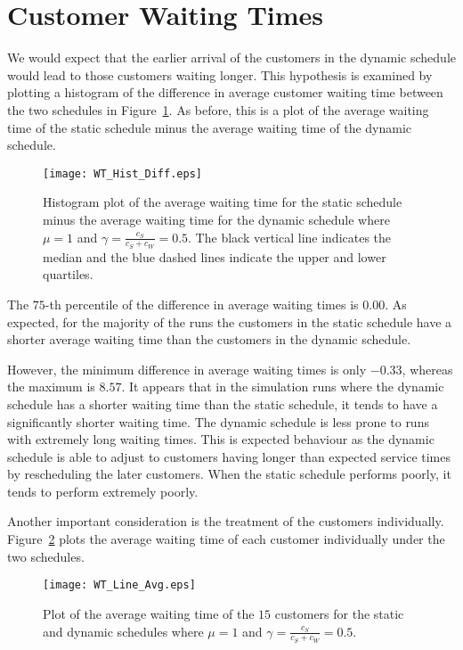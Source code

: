 \section{Customer Waiting Times}
We would expect that the earlier arrival of the customers in the dynamic schedule would lead to those customers waiting longer. This hypothesis is examined by plotting a histogram of the difference in average customer waiting time between the two schedules in Figure~\ref{fig:Diff_Wait}. As before, this is a plot of the average waiting time of the static schedule minus the average waiting time of the dynamic schedule.
\begin{figure}[htb]
	\centering
	\texttt{[image: WT\_Hist\_Diff.eps]}
	\caption{Histogram plot of the average waiting time for the static schedule minus the average waiting time for the dynamic schedule where $\mu = 1$ and $\gamma = \frac{c_{S}}{c_{S} + c_{W}} = 0.5$. The black vertical line indicates the median and the blue dashed lines indicate the upper and lower quartiles.}
	\label{fig:Diff_Wait}
\end{figure}

The $75$-th percentile of the difference in average waiting times is $0.00$. As expected, for the majority of the runs the customers in the static schedule have a shorter average waiting time than the customers in the dynamic schedule.

However, the minimum difference in average waiting times is only $-0.33$, whereas the maximum is $8.57$. It appears that in the simulation runs where the dynamic schedule has a shorter waiting time than the static schedule, it tends to have a significantly shorter waiting time. The dynamic schedule is less prone to runs with extremely long waiting times. This is expected behaviour as the dynamic schedule is able to adjust to customers having longer than expected service times by rescheduling the later customers. When the static schedule performs poorly, it tends to perform extremely poorly.

Another important consideration is the treatment of the customers individually. Figure~\ref{fig:Avg_Wait_Position} plots the average waiting time of each customer individually under the two schedules.
\begin{figure}[htb]
	\centering
	\texttt{[image: WT\_Line\_Avg.eps]}
	\caption{Plot of the average waiting time of the $15$ customers for the static and dynamic schedules where $\mu = 1$ and $\gamma = \frac{c_{S}}{c_{S} + c_{W}} = 0.5$.}
	\label{fig:Avg_Wait_Position}
\end{figure}

